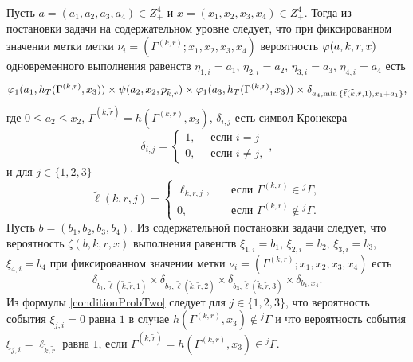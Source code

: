 \documentclass[a4paper,12pt,russian]{extarticle}
\newcommand{\G}{\Gamma}
\newcommand{\ga}[1]{\Gamma^{\left( #1 \right)} }
\begin{document}
Пусть $a=(a_1, a_2, a_3, a_4) \in Z_+^4$ и $x=(x_1, x_2, x_3, x_4) \in Z_+^4$. Тогда из постановки задачи на содержательном уровне следует, что при фиксированном значении метки метки $\nu_i=(\ga{k,r}; x_1, x_2, x_3, x_4)$ вероятность $\varphi(a,k,r,x)$ одновременного выполнения равенств $\eta_{1,i}=a_1$, $\eta_{2,i}=a_2$, $\eta_{3,i}=a_3$, $\eta_{4,i}=a_4$ есть 
\begin{equation}
\vp_1(a_1,h_T(\ga{{k},{r}},x_3)) \times \psi(a_2,x_2, p_{\tilde{k},\tilde{r}}) \times \vp_1(a_3,h_T(\ga{{k},{r}},x_3))
\times \delta_{a_4,\min{\{\tilde{\ell}(\tilde{k},\tilde{r},1), x_1+a_1}\}},
\label{conditionProbOne}
\end{equation}
где $0\leqslant a_2\leqslant x_2$, $\ga{\tilde{k},\tilde{r}}=h(\ga{k,r},x_3)$,  $\delta_{i,j}$ есть символ Кронекера
\begin{equation*}
\delta_{i,j}=\begin{cases} 1, \quad \text{ если }i=j\\0, \quad \text{ если } i\neq j,
\end{cases},
\end{equation*}
и для $j\in \{1, 2, 3\}$
\begin{equation*}
\widetilde{\ell}(k,r,j)=\begin{cases}
\ell_{k,r,j},& \quad \text{если } \ga{k,r} \in {}^j\G,\\
0,& \quad \text{если } \ga{k,r} \notin {}^j\G. \end{cases}
\end{equation*}
Пусть $b=(b_1, b_2, b_3, b_4)$. Из содержательной постановки задачи следует, что вероятность $\zeta(b, k, r, x)$ выполнения равенств $\xi_{1,i}=b_1$, $\xi_{2,i}=b_2$, $\xi_{3,i}=b_3$, $\xi_{4,i}=b_4$ при фиксированном значении метки $\nu_i=(\ga{k,r}; x_1, x_2, x_3, x_4)$ есть
\begin{equation}
\delta_{b_1,\tilde{\ell}(\tilde{k},\tilde{r},1)} \times \delta_{b_2,\tilde{\ell}(\tilde{k},\tilde{r},2)} \times 
\delta_{b_3,\tilde{\ell}(\tilde{k},\tilde{r},3)} \times \delta_{b_4,x_4}.
\label{conditionProbTwo}
\end{equation}
Из формулы \eqref{conditionProbTwo} следует для $j\in \{1, 2, 3\}$, что вероятность события $\xi_{j,i}=0$ равна $1$ в случае $h(\ga{k,r},x_3)\notin {}^j\G$ и что вероятность события $\xi_{j,i}=\ell_{\tilde{k},\tilde{r}}$ равна $1$, если $\ga{\tilde{k},\tilde{r}}=h(\ga{k,r},x_3)\in {}^j\G$.


\end{document}
